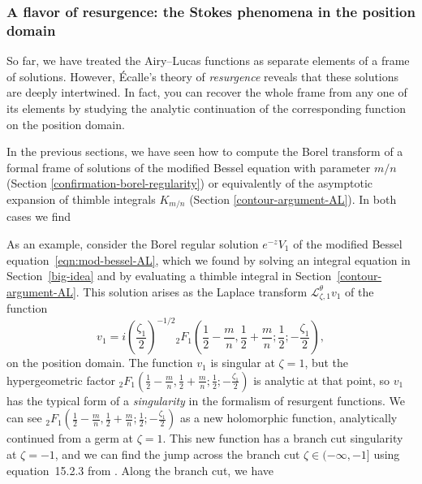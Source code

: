 \documentclass{article}
\newcommand{\laplace}{\mathcal{L}}
\theoremstyle{definition}
\theoremstyle{plain}
\newenvironment{old}{\color{RoyalBlue}}{\color{black}}
\newenvironment{revised}{\color{DarkBlue}}{\color{black}}
\begin{document}
\subsubsection{A flavor of resurgence: the Stokes phenomena in the position domain}\label{resurgence-AL}
%
\begin{revised}
So far, we have treated the Airy--Lucas functions as separate elements of a frame of solutions. However, \'{E}calle's theory of {\em resurgence} reveals that these solutions are deeply intertwined. In fact, you can recover the whole frame from any one of its elements by studying the analytic continuation of the corresponding function on the position domain.

\begin{old}In the previous sections, we have seen how to compute the Borel transform of a formal frame of solutions of the modified Bessel equation with parameter $m/n$ (Section \ref{confirmation-borel-regularity}) or equivalently of the asymptotic expansion of thimble integrals $K_{m/n}$ (Section \ref{contour-argument-AL}). In both cases we find\par\end{old}
As an example, consider the Borel regular solution $e^{-z} V_1$ of the modified Bessel equation~\eqref{eqn:mod-bessel-AL}, which we found by solving an integral equation in Section~\ref{big-idea} and by evaluating a thimble integral in Section~\ref{contour-argument-AL}. This solution arises as the Laplace transform $\laplace^\theta_{\zeta, 1} v_1$ of the function
\[ v_1 = i \left(\frac{\zeta_1}{2}\right)^{-1/2} {}_2F_1\left(\frac{1}{2}-\frac{m}{n},\frac{1}{2}+\frac{m}{n};\frac{1}{2};-\frac{\zeta_1}{2}\right), \]
on the position domain. The function $v_1$ is singular at $\zeta = 1$, but the hypergeometric factor ${}_2F_1\left(\frac{1}{2}-\frac{m}{n},\frac{1}{2}+\frac{m}{n};\frac{1}{2};-\frac{\zeta_1}{2}\right)$ is analytic at that point, so $v_1$ has the typical form of a {\em singularity} in the formalism of resurgent functions. We can see ${}_2F_1\left(\frac{1}{2}-\frac{m}{n},\frac{1}{2}+\frac{m}{n};\frac{1}{2};-\frac{\zeta_1}{2}\right)$ as a new holomorphic function, analytically continued from a germ at $\zeta = 1$. This new function has a branch cut singularity at $\zeta=-1$, and we can find the jump across the branch cut $\zeta \in (-\infty, -1]$ using equation~15.2.3 from \cite{dlmf}. Along the branch cut, we have

\end{revised}
\end{document}
